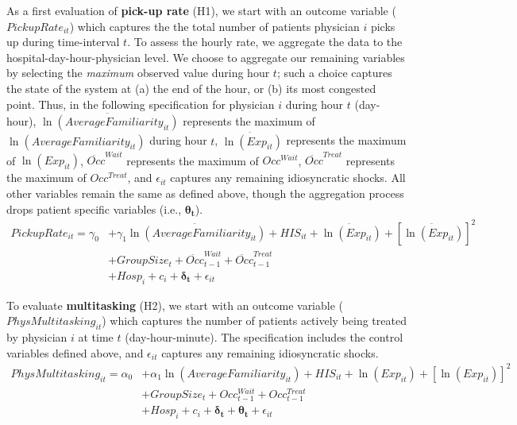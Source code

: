  As a first evaluation of \textbf{pick-up rate} (H1), we start with an outcome variable ($PickupRate_{it}$) which captures the the total number of patients physician $i$ picks up during time-interval $t$. To assess the hourly rate, we aggregate the data to the hospital-day-hour-physician level. We choose to aggregate our remaining variables by selecting the \textit{maximum} observed value during hour $t$; such a choice captures the state of the system at (a) the end of the hour, or (b) its most congested point. Thus, in the following specification for physician $i$ during hour $t$ (day-hour), $\ddot{\ln(AverageFamiliarity_{it})}$ represents the maximum of $\ln(AverageFamiliarity_{it})$ during hour $t$, $\ddot{\ln (Exp_{it})}$ represents the maximum of $\ln(Exp_{it})$, $\ddot{Occ}^{Wait}$ represents the maximum of $Occ^{Wait}$, $\ddot{Occ}^{Treat}$ represents the maximum of $Occ^{Treat}$, and $\epsilon_{it}$ captures any remaining idiosyncratic shocks. All other variables remain the same as defined above, though the aggregation process drops patient specific variables (i.e., $\boldsymbol{\theta_t}$).
  \begin{equation} \label{eqn_pu_rate_1} \begin{split} %
       PickupRate_{it} = \gamma_0 & + \gamma_1 \ddot{\ln(AverageFamiliarity_{it})} +  HIS_{it} + \ddot{\ln (Exp_{it})} + [\ddot{\ln (Exp_{it})}]^2 \\
       & + GroupSize_{t} + \ddot{Occ}_{t-1}^{Wait} + \ddot{Occ}_{t-1}^{Treat} \\
       & + Hosp_i + c_i + \boldsymbol{\delta_t} + \epsilon_{it} 
  \end{split}  \end{equation}
 
 To evaluate \textbf{multitasking} (H2), we start with an outcome variable ($PhysMultitasking_{it}$) which captures the number of patients actively being treated by physician $i$ at time $t$ (day-hour-minute). The specification includes the control variables defined above, and $\epsilon_{it}$ captures any remaining idiosyncratic shocks.
  \begin{equation} \begin{split} %
       PhysMultitasking_{it} = \alpha_0 & + \alpha_1 \ln(AverageFamiliarity_{it}) + HIS_{it} + \ln(Exp_{it}) + [\ln(Exp_{it})]^2 \\
       & + GroupSize_{t} + Occ_{t-1}^{Wait} + Occ_{t-1}^{Treat} \\
       & + Hosp_i + c_i + \boldsymbol{\delta_t} + \boldsymbol{\theta_t} + \epsilon_{it} 
  \end{split}  \end{equation}
  
